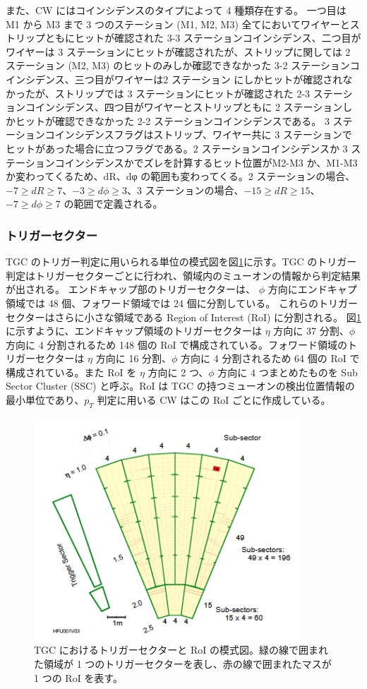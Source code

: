 また、CW にはコインシデンスのタイプによって 4 種類存在する。
一つ目は M1 から M3 まで 3 つのステーション (M1, M2, M3) 全てにおいてワイヤーとストリップともにヒットが確認された 3-3 ステーションコインシデンス、二つ目がワイヤーは 3 ステーションにヒットが確認されたが、ストリップに関しては 2 ステーション (M2, M3) のヒットのみしか確認できなかった 3-2 ステーションコインシデンス、三つ目がワイヤーは2 ステーション  にしかヒットが確認されなかったが、ストリップでは 3 ステーションにヒットが確認された 2-3 ステーションコインシデンス、四つ目がワイヤーとストリップともに 2 ステーションしかヒットが確認できなかった 2-2 ステーションコインシデンスである。
3 ステーションコインシデンスフラグはストリップ、ワイヤー共に 3 ステーションでヒットがあった場合に立つフラグである。2 ステーションコインシデンスか 3 ステーションコインシデンスかでズレを計算するヒット位置がM2-M3 か、M1-M3 か変わってくるため、dR、dφ の範囲も変わってくる。2 ステーションの場合、$−7 \geq dR \geq 7$、$−3 \geq d\phi \geq 3$、3 ステーションの場合、$−15 \geq dR \geq 15$、$−7 \geq d\phi \geq 7$ の範囲で定義される。


\subsubsection{トリガーセクター}
TGC のトリガー判定に用いられる単位の模式図を図\ref{fig:RoI}に示す。TGC のトリガー判定はトリガーセクターごとに行われ、領域内のミューオンの情報から判定結果が出される。
エンドキャップ部のトリガーセクターは、 $\phi$ 方向にエンドキャプ領域では 48 個、フォワード領域では 24 個に分割している。
これらのトリガーセクターはさらに小さな領域である Region of Interest (RoI) に分割される。
図\ref{fig:RoI} に示すように、エンドキャップ領域のトリガーセクターは $\eta$ 方向に 37 分割、$\phi$ 方向に 4 分割されるため 148 個の RoI で構成されている。フォワード領域のトリガーセクターは $\eta$ 方向に 16 分割、$\phi$ 方向に 4 分割されるため 64 個の RoI で構成されている。また RoI を $\eta$ 方向に 2 つ、$\phi$ 方向に 4 つまとめたものを Sub Sector Cluster (SSC) と呼ぶ。RoI は TGC の持つミューオンの検出位置情報の最小単位であり、$p_T$ 判定に用いる CW はこの RoI ごとに作成している。

\begin{figure}[tb]
  \centering
  \includegraphics[clip, width=10cm]{fig/3/RoI.png}
  \caption{TGC におけるトリガーセクターと RoI の模式図。緑の線で囲まれた領域が 1 つのトリガーセクターを表し、赤の線で囲まれたマスが 1 つの RoI を表す。}
  \label{fig:RoI}
\end{figure}

